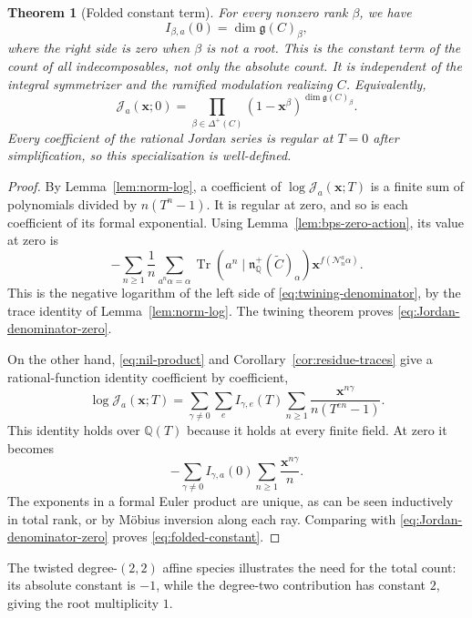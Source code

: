 \documentclass[11pt, reqno]{amsart}
\numberwithin{equation}{section}
\newtheorem{theorem}{Theorem}[section]
\theoremstyle{definition}
\theoremstyle{remark}
\newcommand{\op}[1]{\operatorname{#1}}
\newcommand{\mb}[1]{\mathbb{#1}}
\newcommand{\mc}[1]{\mathcal{#1}}
\newcommand{\Tr}{\op{Tr}}
\begin{document}
\begin{theorem}[Folded constant term]\label{thm:folded-constant}
For every nonzero rank $\beta$, we have
\begin{equation}\label{eq:folded-constant} I_{\beta,a}(0)=\dim\mathfrak g(C)_\beta,\end{equation}
where the right side is zero when $\beta$ is not a root. This is the
constant term of the count of \emph{all} indecomposables, not only the
absolute count. It is independent of the integral symmetrizer and the
ramified modulation realizing $C$. Equivalently,
\begin{equation}\label{eq:Jordan-denominator-zero} \mc J_a(\mathbf x;0) =\prod_{\beta\in\Delta^+(C)} (1-\mathbf x^\beta)^{\dim\mathfrak g(C)_\beta}.\end{equation}
Every coefficient of the rational Jordan series is regular at $T=0$
after simplification, so this specialization is well-defined.
\end{theorem}
\begin{proof}
By Lemma~\ref{lem:norm-log}, a coefficient of
$\log\mc J_a(\mathbf x;T)$ is a finite sum of polynomials divided
by $n(T^n-1)$. It is regular at zero, and so is each coefficient of its
formal exponential. Using Lemma~\ref{lem:bps-zero-action}, its value at
zero is
\[ -\sum_{n\geq1}\frac1n \sum_{a^n\alpha=\alpha} \Tr(a^n\mid\mathfrak n_{\mb Q}^+(\widetilde C)_\alpha) \mathbf x^{f(\mc N_n^a\alpha)}. \]
This is the negative logarithm of the left side of
\eqref{eq:twining-denominator}, by the trace identity of Lemma~\ref{lem:norm-log}.
The twining theorem proves \eqref{eq:Jordan-denominator-zero}.

On the other hand, \eqref{eq:nil-product} and
Corollary~\ref{cor:residue-traces} give a rational-function identity
coefficient by coefficient,
\[ \log\mc J_a(\mathbf x;T) =\sum_{\gamma\ne0}\sum_e I_{\gamma,e}(T) \sum_{n\geq1}\frac{\mathbf x^{n\gamma}} {n(T^{en}-1)}. \]
This identity holds over $\mb Q(T)$ because it holds at every finite
field. At zero it becomes
\[ -\sum_{\gamma\ne0} I_{\gamma,a}(0) \sum_{n\geq1}\frac{\mathbf x^{n\gamma}}n. \]
The exponents in a formal Euler product are unique, as can be seen
inductively in total rank, or by M\"obius inversion along each ray.
Comparing with \eqref{eq:Jordan-denominator-zero} proves
\eqref{eq:folded-constant}.
\end{proof}



The twisted degree-$(2,2)$ affine species illustrates the need for
the total count: its absolute constant is $-1$, while the degree-two
contribution has constant $2$, giving the root multiplicity $1$.
\end{document}
